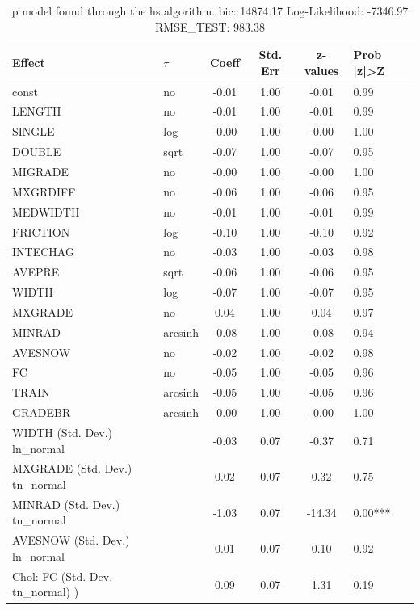 \begin{table}
	\caption{p model found through the hs algorithm. bic: 14874.17 Log-Likelihood: -7346.97 RMSE_TEST: 983.38}
	\begin{center}
		\begin{tabular}{|l|l|c|c|c|l|}
			\hline
			Effect & $\tau$ & Coeff & Std. Err & z-values & Prob |z|>Z \\
			\hline
			const & no & -0.01 & 1.00 & -0.01 & 0.99 \\
			\hline
			LENGTH & no & -0.01 & 1.00 & -0.01 & 0.99 \\
			\hline
			SINGLE & log & -0.00 & 1.00 & -0.00 & 1.00 \\
			\hline
			DOUBLE & sqrt & -0.07 & 1.00 & -0.07 & 0.95 \\
			\hline
			MIGRADE & no & -0.00 & 1.00 & -0.00 & 1.00 \\
			\hline
			MXGRDIFF & no & -0.06 & 1.00 & -0.06 & 0.95 \\
			\hline
			MEDWIDTH & no & -0.01 & 1.00 & -0.01 & 0.99 \\
			\hline
			FRICTION & log & -0.10 & 1.00 & -0.10 & 0.92 \\
			\hline
			INTECHAG & no & -0.03 & 1.00 & -0.03 & 0.98 \\
			\hline
			AVEPRE & sqrt & -0.06 & 1.00 & -0.06 & 0.95 \\
			\hline
			WIDTH & log & -0.07 & 1.00 & -0.07 & 0.95 \\
			\hline
			MXGRADE & no & 0.04 & 1.00 & 0.04 & 0.97 \\
			\hline
			MINRAD & arcsinh & -0.08 & 1.00 & -0.08 & 0.94 \\
			\hline
			AVESNOW & no & -0.02 & 1.00 & -0.02 & 0.98 \\
			\hline
			FC & no & -0.05 & 1.00 & -0.05 & 0.96 \\
			\hline
			TRAIN & arcsinh & -0.05 & 1.00 & -0.05 & 0.96 \\
			\hline
			GRADEBR & arcsinh & -0.00 & 1.00 & -0.00 & 1.00 \\
			\hline
			WIDTH (Std. Dev.) ln_normal &  & -0.03 & 0.07 & -0.37 & 0.71 \\
			\hline
			MXGRADE (Std. Dev.) tn_normal &  & 0.02 & 0.07 & 0.32 & 0.75 \\
			\hline
			MINRAD (Std. Dev.) tn_normal &  & -1.03 & 0.07 & -14.34 & 0.00*** \\
			\hline
			AVESNOW (Std. Dev.) ln_normal &  & 0.01 & 0.07 & 0.10 & 0.92 \\
			\hline
			 Chol: FC (Std. Dev. tn_normal) ) &  & 0.09 & 0.07 & 1.31 & 0.19 \\

\end{tabular}
\end{center}
\end{table}
